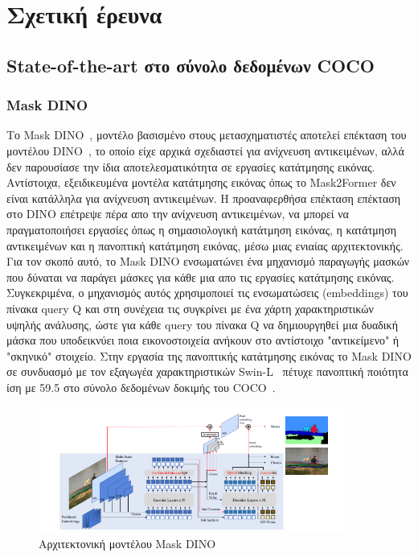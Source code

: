 \documentclass[12pt]{article}
\numberwithin{equation}{section}
\begin{document}
\newpage

\section{Σχετική έρευνα}

\subsection{State-of-the-art στο σύνολο δεδομένων COCO}

\subsubsection{Mask DINO}

Το Mask DINO~\cite{li2022maskdinounifiedtransformerbased}, μοντέλο βασισμένο στους μετασχηματιστές αποτελεί επέκταση του μοντέλου DINO~\cite{zhang2022dinodetrimproveddenoising}, το οποίο είχε αρχικά σχεδιαστεί για ανίχνευση αντικειμένων, αλλά δεν παρουσίασε την ίδια αποτελεσματικότητα σε εργασίες κατάτμησης εικόνας. Αντίστοιχα, εξειδικευμένα μοντέλα κατάτμησης εικόνας όπως το Mask2Former δεν είναι κατάλληλα για ανίχνευση αντικειμένων. Η προαναφερθήσα επέκταση επέκταση στο DINO επέτρεψε πέρα απο την ανίχνευση αντικειμένων, να μπορεί να πραγματοποιήσει εργασίες όπως η σημασιολογική κατάτμηση εικόνας, η κατάτμηση αντικειμένων και η πανοπτική κατάτμηση εικόνας, μέσω μιας ενιαίας αρχιτεκτονικής. Για τον σκοπό αυτό, το Mask DINO ενσωματώνει ένα μηχανισμό παραγωγής μασκών που δύναται να παράγει μάσκες για κάθε μια απο τις εργασίες κατάτμησης εικόνας. Συγκεκριμένα, ο μηχανισμός αυτός χρησιμοποιεί τις ενσωματώσεις (embeddings) του πίνακα query Q και στη συνέχεια τις συγκρίνει με ένα χάρτη χαρακτηριστικών υψηλής ανάλυσης, ώστε για κάθε query του πίνακα Q να δημιουργηθεί μια δυαδική μάσκα που υποδεικνύει ποια εικονοστοιχεία ανήκουν στο αντίστοιχο "αντικείμενο" ή "σκηνικό" στοιχείο. Στην εργασία της πανοπτικής κατάτμησης εικόνας το Mask DINO σε συνδυασμό με τον εξαγωγέα χαρακτηριστικών Swin-L~\cite{liu2021swintransformerhierarchicalvision} πέτυχε πανοπτική ποιότητα ίση με 59.5 στο σύνολο δεδομένων δοκιμής του COCO~\cite{lin2015microsoftcococommonobjects}.\\

\begin{figure}[h!]
  \centering
  \includegraphics[width=0.9\textwidth]{images/MaskDINO.png} %
  \caption{Αρχιτεκτονική μοντέλου Mask DINO}
  \label{figure 20}
\end{figure} 
\end{document}
